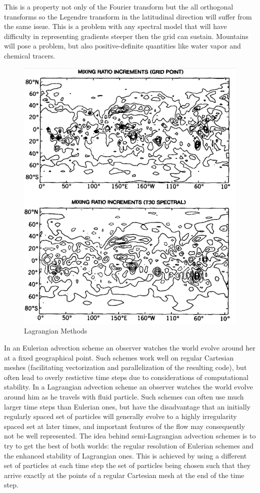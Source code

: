 This is a property not only of the
Fourier transform but the all orthogonal transforms so the Legendre
transform in the latitudinal direction will suffer from the same issue. This
is a problem with any spectral model that will have difficulty in
representing gradients steeper then the grid can sustain.
Mountains will pose a problem, but also positive-definite quantities like
water vapor and chemical tracers.

\begin{figure}[h!]
    \centering
    \includegraphics[width=0.5\linewidth]{uploads/Screenshot 2024-11-19 130213.png}
    \caption{Lagrangian Methods}
    \label{fig:lag method}
\end{figure}
In an Eulerian advection scheme an observer watches the world evolve around her at a fixed geographical point. Such schemes work well on regular Cartesian meshes (facilitating vectorization and parallelization of the resulting code), but often lead to overly restictive time steps due to considerations of computational stability. In a Lagrangian advection scheme an observer watches the world evolve around him as he travels with fluid particle. Such schemes can often use much larger time steps than Eulerian ones, but have the disadvantage that an initially regularly spaced set of particles will generally evolve to a highly irregularity spaced set at later times, and important features of the flow may consequently not be well represented. The idea behind semi-Lagrangian advection schemes is to try to get the best of both worlds: the regular resolution of Eulerian schemes and the enhanced stability of Lagrangian ones. This is achieved by using a different set of particles at each time step the set of particles being chosen such that they arrive exactly at the points of a regular Cartesian mesh at the end of the time step.

